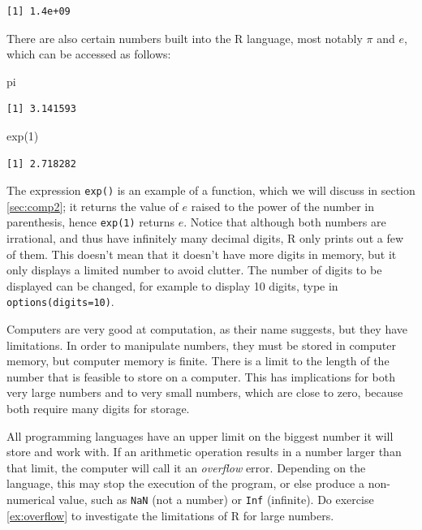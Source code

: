 \documentclass[
  letterpaper,
  DIV=11,
  numbers=noendperiod]{scrreprt}
\newenvironment{Shaded}{\begin{snugshade}}{\end{snugshade}}
\newcommand{\DecValTok}[1]{\textcolor[rgb]{0.68,0.00,0.00}{#1}}
\newcommand{\FunctionTok}[1]{\textcolor[rgb]{0.28,0.35,0.67}{#1}}
\newcommand{\NormalTok}[1]{\textcolor[rgb]{0.00,0.23,0.31}{#1}}
\begin{document}
\begin{verbatim}
[1] 1.4e+09
\end{verbatim}

There are also certain numbers built into the R language, most notably
\(\pi\) and \(e\), which can be accessed as follows:

\begin{Shaded}
\begin{Highlighting}[]
\NormalTok{pi}
\end{Highlighting}
\end{Shaded}

\begin{verbatim}
[1] 3.141593
\end{verbatim}

\begin{Shaded}
\begin{Highlighting}[]
\FunctionTok{exp}\NormalTok{(}\DecValTok{1}\NormalTok{)}
\end{Highlighting}
\end{Shaded}

\begin{verbatim}
[1] 2.718282
\end{verbatim}

The expression \texttt{exp()} is an example of a function, which we will
discuss in section \ref{sec:comp2}; it returns the value of \(e\) raised
to the power of the number in parenthesis, hence \texttt{exp(1)} returns
\(e\). Notice that although both numbers are irrational, and thus have
infinitely many decimal digits, R only prints out a few of them. This
doesn't mean that it doesn't have more digits in memory, but it only
displays a limited number to avoid clutter. The number of digits to be
displayed can be changed, for example to display 10 digits, type in
\texttt{options(digits=10)}.

Computers are very good at computation, as their name suggests, but they
have limitations. In order to manipulate numbers, they must be stored in
computer memory, but computer memory is finite. There is a limit to the
length of the number that is feasible to store on a computer. This has
implications for both very large numbers and to very small numbers,
which are close to zero, because both require many digits for storage.

All programming languages have an upper limit on the biggest number it
will store and work with. If an arithmetic operation results in a number
larger than that limit, the computer will call it an \emph{overflow}
error. Depending on the language, this may stop the execution of the
program, or else produce a non-numerical value, such as \texttt{NaN}
(not a number) or \texttt{Inf} (infinite). Do exercise \ref{ex:overflow}
to investigate the limitations of R for large numbers.
\end{document}
